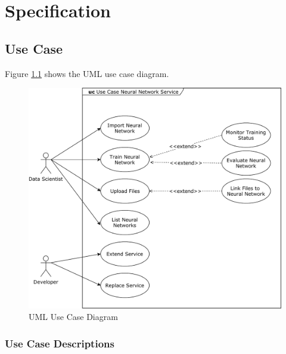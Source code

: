 \chapter{Specification}\label{specification}

\section{Use Case}\label{use-case}

Figure \ref{img.use_case_nn} shows the UML use case diagram.

\begin{figure}
\centering
\includegraphics[width=15.00000cm]{images/use_case_nn}
\caption{UML Use Case Diagram \label{img.use_case_nn}}
\end{figure}

\subsection{Use Case Descriptions}\label{use-case-descriptions}

